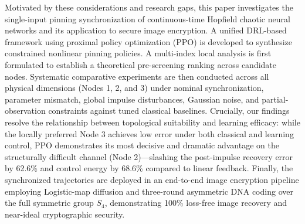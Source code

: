 \documentclass[a4paper,fleqn]{cas-dc}
\theoremstyle{plain}
\theoremstyle{definition}
\begin{document}
Motivated by these considerations and research gaps, this paper investigates the single-input pinning synchronization of continuous-time Hopfield chaotic neural networks and its application to secure image encryption. A unified DRL-based framework using proximal policy optimization (PPO) is developed to synthesize constrained nonlinear pinning policies. A multi-index local analysis is first formulated to establish a theoretical pre-screening ranking across candidate nodes. Systematic comparative experiments are then conducted across all physical dimensions (Nodes 1, 2, and 3) under nominal synchronization, parameter mismatch, global impulse disturbances, Gaussian noise, and partial-observation constraints against tuned classical baselines. Crucially, our findings resolve the relationship between topological suitability and learning efficacy: while the locally preferred Node 3 achieves low error under both classical and learning control, PPO demonstrates its most decisive and dramatic advantage on the structurally difficult channel (Node 2)—slashing the post-impulse recovery error by 62.6\% and control energy by 68.6\% compared to linear feedback. Finally, the synchronized trajectories are deployed in an end-to-end image encryption pipeline employing Logistic-map diffusion and three-round asymmetric DNA coding over the full symmetric group $S_4$, demonstrating 100\% loss-free image recovery and near-ideal cryptographic security.
\end{document}
